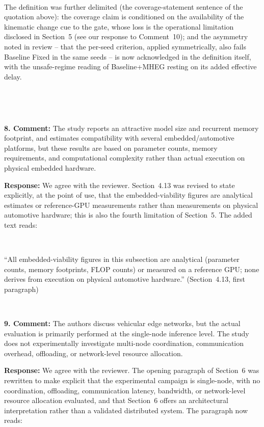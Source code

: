 \documentclass[1p,12pt,authoryear]{elsarticle}
\providecommand{\revcolor}{black}%
\begin{document}
~

{\color{\revcolor}The definition was further delimited (the coverage-statement sentence of the quotation above): the coverage claim is conditioned on the availability of the kinematic change cue to the gate, whose loss is the operational limitation disclosed in Section~5 (see our response to Comment~10); and the asymmetry noted in review -- that the per-seed criterion, applied symmetrically, also fails Baseline Fixed in the same seeds -- is now acknowledged in the definition itself, with the unsafe-regime reading of Baseline+MHEG resting on its added effective delay.}

~

~

\noindent \textbf{8. Comment:} The study reports an attractive model size and recurrent memory footprint, and estimates compatibility with several embedded/automotive platforms, but these results are based on parameter counts, memory requirements, and computational complexity rather than actual execution on physical embedded hardware.

\vspace{2mm}
\noindent \textbf{Response:} We agree with the reviewer. Section~4.13 was revised to state explicitly, at the point of use, that the embedded-viability figures are analytical estimates or reference-GPU measurements rather than measurements on physical automotive hardware; this is also the fourth limitation of Section~5. The added text reads:

~

``All embedded-viability figures in this subsection are analytical (parameter counts, memory footprints, FLOP counts) or measured on a reference GPU; none derives from execution on physical automotive hardware.'' (Section~4.13, first paragraph)

~

\noindent \textbf{9. Comment:} The authors discuss vehicular edge networks, but the actual evaluation is primarily performed at the single-node inference level. The study does not experimentally investigate multi-node coordination, communication overhead, offloading, or network-level resource allocation.

\vspace{2mm}
\noindent \textbf{Response:} We agree with the reviewer. The opening paragraph of Section~6 was rewritten to make explicit that the experimental campaign is single-node, with no coordination, offloading, communication latency, bandwidth, or network-level resource allocation evaluated, and that Section~6 offers an architectural interpretation rather than a validated distributed system. The paragraph now reads:
\end{document}
